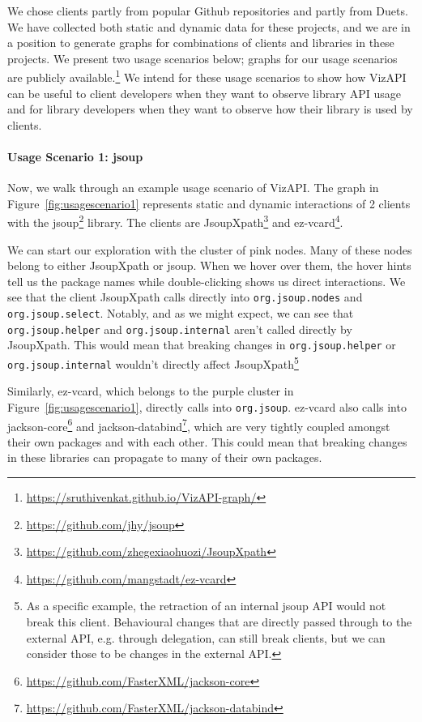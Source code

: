 We chose clients partly
from popular Github repositories and partly from Duets.
We have collected both static and dynamic data for these projects, 
and we are in a position
to generate graphs for combinations of clients and libraries
in these projects. 
We present two usage scenarios below; graphs for 
our usage scenarios are publicly available.\footnote{\url{https://sruthivenkat.github.io/VizAPI-graph/}}
We intend for these usage scenarios to show how VizAPI can be useful to client developers when they want to observe library API usage and for library developers when they want to observe how their library is used by clients.

\paragraph{Usage Scenario 1: jsoup}
Now, we walk through an example usage scenario of VizAPI.
The graph in Figure~\ref{fig:usagescenario1} represents static and dynamic interactions of 2 clients with the jsoup\footnote{\url{https://github.com/jhy/jsoup}\label{jsoup}} library. The clients are JsoupXpath\footnote{\url{https://github.com/zhegexiaohuozi/JsoupXpath}\label{jsoupxpath}} and ez-vcard\footnote{\url{https://github.com/mangstadt/ez-vcard}\label{ez-vcard}}.

We can start our exploration with the cluster of pink nodes. Many of these nodes belong to either JsoupXpath or jsoup. When we hover over them, the hover hints tell us the package names while double-clicking shows us direct interactions. We see that the client JsoupXpath calls directly into \texttt{org.jsoup.nodes} and \texttt{org.jsoup.select}. Notably, and as we might expect, we can see that \texttt{org.jsoup.helper} and \texttt{org.jsoup.internal} aren't called directly by JsoupXpath. This would mean that breaking changes in \texttt{org.jsoup.helper} or \texttt{org.jsoup.internal} wouldn't directly affect JsoupXpath\footnote{As a specific example, the retraction of an internal jsoup API would not break this client. Behavioural changes that are directly passed through to the external API, e.g. through delegation, can still break clients, but we can consider those to be changes in the external API.} 

Similarly, ez-vcard, which belongs to the purple cluster in Figure~\ref{fig:usagescenario1}, directly calls into \texttt{org.jsoup}. ez-vcard also calls into jackson-core\footnote{\url{https://github.com/FasterXML/jackson-core}\label{jackson-core}} and jackson-databind\footnote{\url{https://github.com/FasterXML/jackson-databind}\label{jackson-databind}}, which are very tightly coupled amongst their own packages and with each other. This could mean that breaking changes in these libraries can propagate to many of their own packages.

